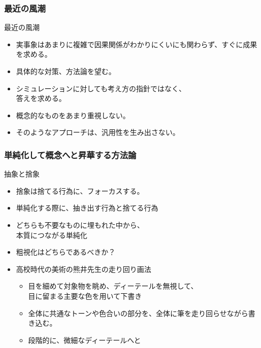 \documentclass[12pt, dvipdfmx]{beamer}
\begin{document}
\begin{frame}
    \frametitle{最近の風潮}
            \begin{block}{最近の風潮}
                \begin{itemize}
                    \item 実事象はあまりに複雑で因果関係がわかりにくいにも関わらず、すぐに成果を求める。
                    \item 具体的な対策、方法論を望む。
                    \item シミュレーションに対しても考え方の指針ではなく、\\答えを求める。
                    \item 概念的なものをあまり重視しない。
                    \item そのようなアプローチは、汎用性を生み出さない。
                \end{itemize}
            \end{block}
\end{frame}

\begin{frame}
    \frametitle{単純化して概念へと昇華する方法論}

            \begin{exampleblock}{抽象と捨象}
                \begin{itemize}
                    \item 捨象は捨てる行為に、フォーカスする。
                    \item 単純化する際に、抽き出す行為と捨てる行為
                    \item どちらも不要なものに埋もれた中から、\\本質につながる単純化
                    \item 粗視化はどちらであるべきか？
                    \item 高校時代の美術の熊井先生の走り回り画法
                    \begin{itemize}
                        \item 目を細めて対象物を眺め、ディーテールを無視して、\\目に留まる主要な色を用いて下書き
                        \item 全体に共通なトーンや色合いの部分を、\alert{全体に筆を走り回らせ}ながら書き込む。
                        \item 段階的に、微細なディーテールへと
                    \end{itemize}
                \end{itemize}
            \end{exampleblock}
\end{frame}
\end{document}
